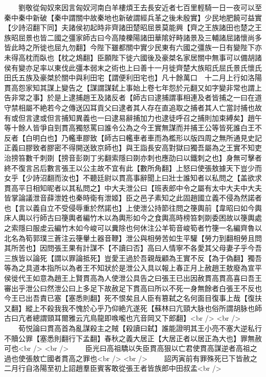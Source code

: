　　劉敬從匈奴來因言匈奴河南白羊樓煩王去長安近者七百里輕騎一日一夜可以至秦中秦中新破【秦中謂關中故秦地也新破謂經兵革之後未殷實】少民地肥饒可益實【少詩沼翻下同】夫諸侯初起時非齊諸田楚昭屈景莫能興【齊之王族諸田也楚之王族昭屈景也皆二國之彊家師古曰今高陵櫟陽諸田華隂好畤諸景及三輔諸屈諸懷尚多皆此時之所徙也屈九勿翻】今陛下雖都關中實少民東有六國之彊族一日有變陛下亦未得高枕而臥也【枕之鴆翻】臣願陛下徙六國後及豪桀名家居關中無事可以備胡諸侯有變亦足率以東伐此彊本弱末之術也上曰善十一月徙齊楚大族昭氏屈氏景氏懷氏田氏五族及豪桀於關中與利田宅【謂便利田宅也】凡十餘萬口　十二月上行如洛陽貫高怨家知其謀上變告之【謀謂謀弑上事始上卷七年怨於元翻又如字變非常也謂上告非常之事】於是上逮捕趙王及諸反者【師古曰逮捕謂事相連及者皆捕之一曰在道守禁相屬不絶若今之傳送囚耳貢父曰逮者其人存在直追取之捕者其人亡當討捕也故有或但言逮或但言捕知異義也一曰逮易辭捕加力也逮徒呼召之捕則加束縛矣】趙午等十餘人皆爭自剄貫高獨怒罵曰誰令公為之今王實無謀而并捕王公等皆死誰白王不反者【白明白也】乃轞車膠致【師古曰轞車者車而為檻形以版四周之無所通見史記正義曰膠致者膠密不得開送致京師也】與王詣長安高對獄曰獨吾屬為之王實不知吏治搒笞數千刺剟【搒音彭剟丁劣翻索隱曰剟亦刺也應劭曰以鐵刺之也】身無可擊者終不復言呂后數言張王以公主故不宜有此【數所角翻】上怒曰使張敖據天下豈少而女乎【少詩沼翻而汝也】不聽廷尉以貫高事辭聞上曰壯士誰知者以私問之【盖欲求貫高平日相知昵者以其私問之】中大夫泄公曰【班表郎中令之屬有太中大夫中大夫皆掌論議泄音薛泄姓也秦時衛有泄姬】臣之邑子素知之此固趙國立義不侵為然諾者也【言以義自立不受侵辱重於然諾也】上使泄公持節往問之箯輿前【韋昭曰如今輿床人輿以行師古曰箯輿者編竹木以為輿形如今之食輿高時榜笞刺剟委困故以箯輿處之索隱曰服䖍云編竹木如今峻可以糞除也何休注公羊筍音峻筍者竹箯一名編齊魯以北名為筍郭璞三蒼注云箯轝土器音鞭】泄公與相勞苦如生平驩【勞力到翻相勞且問其所苦也】因問張王果有計謀不【不讀曰否】高曰人情寧不各愛其父母妻子乎今吾三族皆以論死【謂以罪論抵死】豈愛王過於吾親哉顧為王實不反【為于偽翻】獨吾等為之具道本指所以為者王不知狀於是泄公入具以報上春正月上赦趙王敖廢為宣平侯徙代王如意為趙王上賢貫高為人使泄公具告之曰張王已出因赦貫高貫高喜曰吾王審出乎泄公曰然泄公曰上多足下故赦足下貫高曰所以不死一身無餘者白張王不反也今王已出吾責已塞【塞悉則翻】死不恨矣且人臣有篡弑之名何面目復事上哉【復扶又翻】縱上不殺我我不愧於心乎乃仰絶亢遂死【蘇林曰亢頸大脉也俗所謂胡脉也師古曰亢者總謂頸耳爾雅云亢鳥龍即㗋嚨也亢音岡又下郎翻】<br />
<br />
　　荀悦論曰貫高首為亂謀殺主之賊【殺讀曰弑】誰能證明其王小亮不塞大逆私行不贖公罪【塞悉則翻行下孟翻】春秋之義大居正【大居正者以居正為大也】罪無赦可也<br />
<br />
　　臣光曰高祖驕以失臣貫高狠以亡君使貫高謀逆者高祖之過也使張敖亡國者貫高之罪也<br />
<br />
　　詔丙寅前有罪殊死已下皆赦之　二月行自洛陽至初上詔趙羣臣賓客敢從張王者皆族郎中田叔孟<br />
